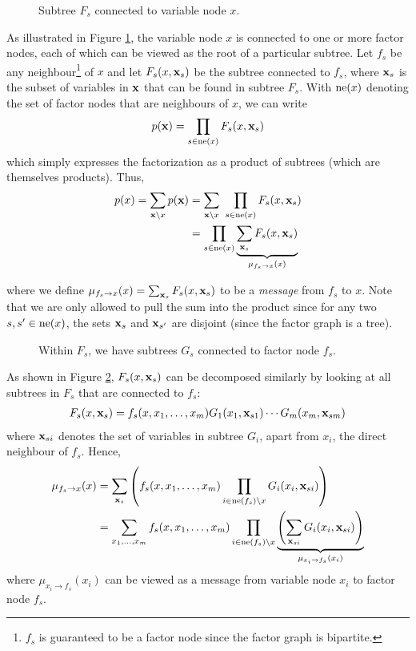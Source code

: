 \begin{figure}[ht]
    \centering
    \scalebox{1.25}{
        
    }
    \caption{Subtree $F_s$ connected to variable node $x$.}
    \label{fig:fac_to_var}
\end{figure}

As illustrated in Figure \ref{fig:fac_to_var}, the variable node $x$ is connected to one or more factor nodes, each of which can be viewed as the root of a particular subtree. Let $f_s$ be any neighbour\footnote{$f_s$ is guaranteed to be a factor node since the factor graph is bipartite.} of $x$ and let $F_s(x, \mathbf{x}_s)$ be the subtree connected to $f_s$, where $\mathbf{x}_s$ is the subset of variables in $\mathbf{x}$ that can be found in subtree $F_s$. With $\operatorname{ne}(x)$ denoting the set of factor nodes that are neighbours of $x$, we can write 
\begin{equation}
    p(\mathbf{x}) = \prod_{s \in \operatorname{ne}(x)} F_s(x, \mathbf{x}_s)
\end{equation}
 which simply expresses the factorization as a product of subtrees (which are themselves products). Thus,
\begin{align}
    p(x) = \sum_{\xx \setminus x} p(\xx) &= \sum_{\xx \setminus x} \ \prod_{s \in \neigh(x)} F_s(x, \xx_s) \\
         &= \prod_{s \in \neigh(x)} \underbrace{\sum_{\xx_s} F_s(x, \xx_s)}_{\mu_{f_s \to x}(x)}
\end{align}

where we define $\mu_{f_s \to x}(x) = \sum_{\mathbf{x}_s} F_s(x, \mathbf{x}_s)$ to be a \textit{message} from $f_s$ to $x$.
Note that we are only allowed to pull the sum into the product since for any two $s, s' \in \operatorname{ne}(x)$, the sets $\mathbf{x}_s$ and $\mathbf{x}_{s'}$ are disjoint (since the factor graph is a tree).

\begin{figure}[ht]
    \centering
    \scalebox{1.25}{
        
    }
    \caption{Within $F_s$, we have subtrees $G_s$ connected to factor node $f_s$.}
    \label{fig:var_to_fac}
\end{figure}

As shown in Figure \ref{fig:var_to_fac}, $F_s(x, \mathbf{x}_s)$ can be decomposed similarly by looking at all subtrees in $F_s$ that are connected to $f_s$:
\begin{align}
    F_s(x, \mathbf{x}_s) = f_s(x, x_1, \dots, x_m) G_1(x_1, \mathbf{x}_{s1}) \cdots G_m(x_m, \mathbf{x}_{sm})
\end{align}
where $\mathbf{x}_{si}$ denotes the set of variables in subtree $G_i$, apart from $x_i$, the direct neighbour of $f_s$.
Hence,
\begin{align}
\label{eq:bp_ftv}
    \mu_{f_s \to x}(x) &= \sum_{\mathbf{x}_s} \left( f_s(x, x_1,\dots,x_m) \prod_{i \in \operatorname{ne}(f_s) \setminus x} G_i(x_i, \mathbf{x}_{si}) \right) \\
    &= \sum_{x_1,\dots,x_m} f_s(x, x_1,\dots,x_m) \prod_{i \in \operatorname{ne}(f_s) \setminus x} \underbrace{\left( \sum_{\mathbf{x}_{si}} G_i(x_i, \mathbf{x}_{si}) \right)}_{\mu_{x_i \to f_s}(x_i)}
\end{align}
where $\mu_{x_i \to f_s}(x_i)$ can be viewed as a message from variable node $x_i$ to factor node $f_s$.

